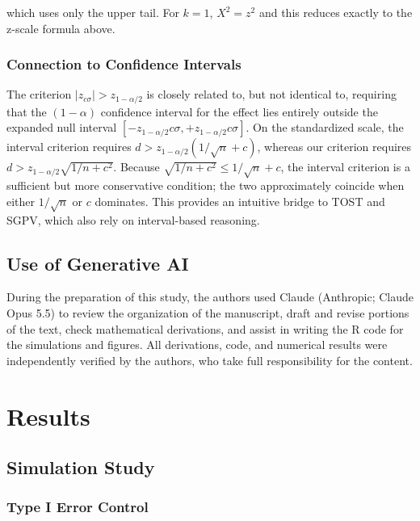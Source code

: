 \documentclass[
  11pt,
  letterpaper,
]{article}
\begin{document}
which uses only the upper tail. For \(k = 1\), \(X^2 = z^2\) and this
reduces exactly to the z-scale formula above.

\subsubsection{Connection to Confidence Intervals}\label{sec-ci}

The criterion \(|z_{c\sigma}| > z_{1-\alpha/2}\) is closely related to,
but not identical to, requiring that the \((1-\alpha)\) confidence
interval for the effect lies entirely outside the expanded null interval
\([-z_{1-\alpha/2} c\sigma, +z_{1-\alpha/2} c\sigma]\). On the
standardized scale, the interval criterion requires
\(d > z_{1-\alpha/2}(1/\sqrt{n} + c)\), whereas our criterion requires
\(d > z_{1-\alpha/2}\sqrt{1/n + c^2}\). Because
\(\sqrt{1/n + c^2} \le 1/\sqrt{n} + c\), the interval criterion is a
sufficient but more conservative condition; the two approximately
coincide when either \(1/\sqrt{n}\) or \(c\) dominates. This provides an
intuitive bridge to TOST and SGPV, which also rely on interval-based
reasoning.

\subsection{Use of Generative AI}\label{sec-ai}

During the preparation of this study, the authors used Claude
(Anthropic; Claude Opus 5.5) to review the organization of the
manuscript, draft and revise portions of the text, check mathematical
derivations, and assist in writing the R code for the simulations and
figures. All derivations, code, and numerical results were independently
verified by the authors, who take full responsibility for the content.

\section{Results}\label{sec-results}

\subsection{Simulation Study}\label{sec-sim}

\subsubsection{Type I Error Control}\label{type-i-error-control}
\end{document}

